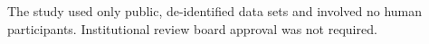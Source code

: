 The study used only public, de-identified data sets and involved no human participants.
Institutional review board approval was not required.
